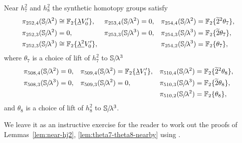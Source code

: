 \begin{lem} \label{lem:theta7-theta8-nearby}
  Near $h_7^2$ and $h_8^2$ the synthetic homotopy groups satisfy
  \begin{align*}    
    \pi_{252,4}(\clambda^2) &\cong \F_2\{ \underline{\lambda} V_0' \},
    & \pi_{253,4}(\clambda^2) &= 0,
    & \pi_{254,4}(\clambda^2) &= \F_2\{ \wt{2}^2 \theta_7 \}, \\
    \pi_{252,3}(\clambda^2) &= 0,
    &  \pi_{253,3}(\clambda^3) &= 0,
    & \pi_{254,3}(\clambda^3) &= \F_2\{ \wt{2} \theta_7 \}, \\
    \pi_{252,3}(\clambda^3) &\cong \F_2\{ \underline{\lambda^2} V_0' \},
    & &
    & \pi_{254,2}(\clambda^3) &= \F_2\{ \theta_7 \},
  \end{align*}
  where $\theta_7$ is a choice of lift of $h_7^2$ to $\operatorname{\mathbb{S}}\hspace{-2.2pt}/\!\lambda^3$
  \begin{align*}
    \pi_{508,4}(\clambda^2) &= 0, &
    \pi_{509,4}(\clambda^2) &= \F_2\{ \underline{\lambda} V_1' \}, &
    \pi_{510,4}(\clambda^2) &= \F_2\{ \wt{2}^2 \theta_8 \}, \\
    \pi_{508,3}(\clambda^3) &= 0, &
    \pi_{509,3}(\clambda^2) &= 0, &
    \pi_{510,3}(\clambda^3) &= \F_2\{ \wt{2} \theta_8 \}, \\
    & & 
    & &
    \pi_{510,2}(\clambda^2) &= \F_2\{ \theta_8 \}, 
  \end{align*}
  and $\theta_8$ is a choice of lift of $h_8^2$ to $\operatorname{\mathbb{S}}\hspace{-2.2pt}/\!\lambda^3$. %
\end{lem}


We leave it as an instructive exercise for the reader to work out the proofs of Lemmas~\ref{lem:near-hj2}, \ref{lem:theta7-theta8-nearby} using \cite[Theorem 9.19]{boundaries}.



